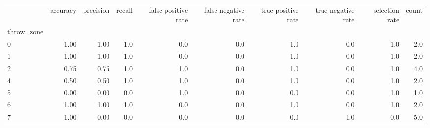 \begin{tabular}{lrrrrrrrrr}
\toprule
{} &  accuracy &  precision &  recall &  false positive rate &  false negative rate &  true positive rate &  true negative rate &  selection rate &  count \\
throw\_zone &           &            &         &                      &                      &                     &                     &                 &        \\
\midrule
0          &      1.00 &       1.00 &     1.0 &                  0.0 &                  0.0 &                 1.0 &                 0.0 &             1.0 &    2.0 \\
1          &      1.00 &       1.00 &     1.0 &                  0.0 &                  0.0 &                 1.0 &                 0.0 &             1.0 &    2.0 \\
2          &      0.75 &       0.75 &     1.0 &                  1.0 &                  0.0 &                 1.0 &                 0.0 &             1.0 &    4.0 \\
4          &      0.50 &       0.50 &     1.0 &                  1.0 &                  0.0 &                 1.0 &                 0.0 &             1.0 &    2.0 \\
5          &      0.00 &       0.00 &     0.0 &                  1.0 &                  0.0 &                 0.0 &                 0.0 &             1.0 &    1.0 \\
6          &      1.00 &       1.00 &     1.0 &                  0.0 &                  0.0 &                 1.0 &                 0.0 &             1.0 &    2.0 \\
7          &      1.00 &       0.00 &     0.0 &                  0.0 &                  0.0 &                 0.0 &                 1.0 &             0.0 &    5.0 \\
\bottomrule
\end{tabular}

